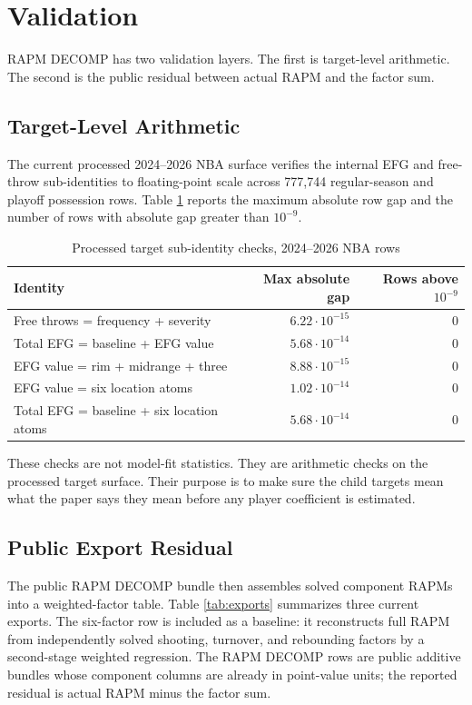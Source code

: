 \documentclass[11pt]{article}
\begin{document}
\section{Validation}

RAPM DECOMP has two validation layers.  The first is target-level arithmetic.
The second is the public residual between actual RAPM and the factor sum.

\subsection{Target-Level Arithmetic}

The current processed 2024--2026 NBA surface verifies the internal EFG and
free-throw sub-identities to floating-point scale across 777,744 regular-season
and playoff possession rows.  Table \ref{tab:rowchecks} reports the maximum
absolute row gap and the number of rows with absolute gap greater than
$10^{-9}$.

\begin{table}[h]
\centering
\caption{Processed target sub-identity checks, 2024--2026 NBA rows}
\label{tab:rowchecks}
\begin{tabular}{lrr}
\toprule
Identity & Max absolute gap & Rows above $10^{-9}$\\
\midrule
Free throws = frequency + severity & $6.22\cdot10^{-15}$ & 0\\
Total EFG = baseline + EFG value & $5.68\cdot10^{-14}$ & 0\\
EFG value = rim + midrange + three & $8.88\cdot10^{-15}$ & 0\\
EFG value = six location atoms & $1.02\cdot10^{-14}$ & 0\\
Total EFG = baseline + six location atoms & $5.68\cdot10^{-14}$ & 0\\
\bottomrule
\end{tabular}
\end{table}

These checks are not model-fit statistics.  They are arithmetic checks on the
processed target surface.  Their purpose is to make sure the child targets mean
what the paper says they mean before any player coefficient is estimated.

\subsection{Public Export Residual}

The public RAPM DECOMP bundle then assembles solved component RAPMs into a
weighted-factor table.  Table \ref{tab:exports} summarizes three current
exports.  The six-factor row is included as a baseline: it reconstructs full
RAPM from independently solved shooting, turnover, and rebounding factors by a
second-stage weighted regression.  The RAPM DECOMP rows are public additive
bundles whose component columns are already in point-value units; the reported
residual is actual RAPM minus the factor sum.
\end{document}
